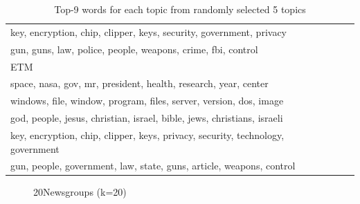 \begin{table}[h]
\begin{tabular}{llll}
key, encryption, chip, clipper, keys, security, government, privacy\\
gun, guns, law, police, people, weapons, crime, fbi, control
\\ \hline
\hline
ETM  \\ \hline
space, nasa, gov, mr, president, health, research, year, center\\
windows, file, window, program, files, server, version, dos, image\\
god, people, jesus, christian, israel, bible, jews, christians, israeli\\
key, encryption, chip, clipper, keys, privacy, security, technology, government\\
gun, people, government, law, state, guns, article, weapons, control
\\ \hline
\end{tabular}
\label{tbl:t3}
\caption{Top-9 words for each topic from randomly selected 5 topics}
\end{table}
\begin{figure}[h]
\centering
{}%
\hfill
{}%
\hfill
\caption{20Newsgroups (k=20)}
\label{fig:loss_20ng_20t}
\end{figure}
